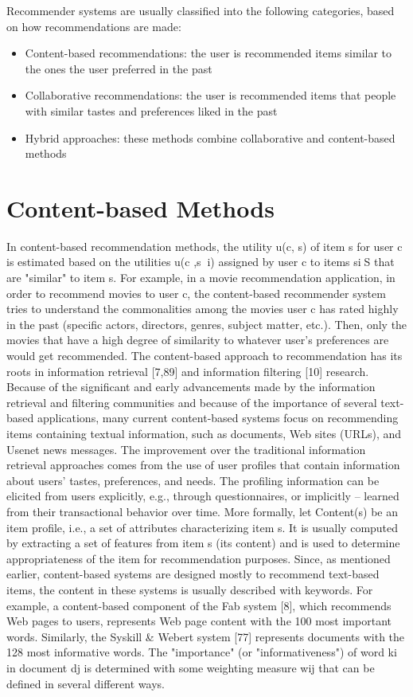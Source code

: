 Recommender systems are usually classified into the following categories, based on how recommendations are made:
\begin{itemize}
\item Content-based recommendations: the user is recommended items similar to the ones the user preferred in the past
\item Collaborative recommendations: the user is recommended items that people with similar tastes and preferences liked in the past
\item Hybrid approaches: these methods combine collaborative and content-based methods
\end{itemize}

\section*{Content-based Methods}
In content-based recommendation methods, the utility u(c, s) of item s for user c is estimated based on the utilities u(c ,si)  assigned by user c to items si∈S that are "similar" to item s. For example, in a movie recommendation application, in order to recommend movies to user c, the content-based recommender system tries to understand the commonalities among the movies user c has rated highly in the past (specific actors, directors, genres, subject matter, etc.). Then, only the movies that have a high degree of similarity to whatever user’s preferences are would get recommended.
The content-based approach to recommendation has its roots in information retrieval [7,89] and information filtering [10] research. Because of the significant and early advancements made by the information retrieval and filtering communities and because of the importance of several text-based applications, many current content-based systems focus on recommending items containing textual information, such as documents, Web sites (URLs), and Usenet news messages. The improvement over the traditional information retrieval approaches comes from the use of user profiles that contain information about users’ tastes, preferences, and needs. The profiling information can be elicited from users explicitly, e.g., through questionnaires, or implicitly – learned from their transactional behavior over time.
More formally, let Content(s) be an item profile, i.e., a set of attributes characterizing item s. It is usually computed by extracting a set of features from item s (its content) and is used to determine appropriateness of the item for recommendation purposes. Since, as mentioned earlier, content-based systems are designed mostly to recommend text-based items, the content in these systems is usually described with keywords. For example, a content-based component of the Fab system [8], which recommends Web pages to users, represents Web page content with the 100 most important words. Similarly, the Syskill & Webert system [77] represents documents with the 128 most informative words. The "importance" (or "informativeness") of word ki in document dj is determined with some weighting measure wij that can be defined in several different ways.
